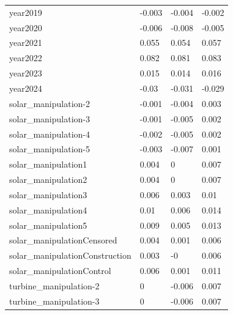 \documentclass{article}
\begin{document}
\begin{table}[]
\begin{tabular}{llll}
year2019                          & -0.003            & -0.004         & -0.002          \\
year2020                          & -0.006            & -0.008         & -0.005          \\
year2021                          & 0.055             & 0.054          & 0.057           \\
year2022                          & 0.082             & 0.081          & 0.083           \\
year2023                          & 0.015             & 0.014          & 0.016           \\
year2024                          & -0.03             & -0.031         & -0.029          \\
solar\_manipulation-2             & -0.001            & -0.004         & 0.003           \\
solar\_manipulation-3             & -0.001            & -0.005         & 0.002           \\
solar\_manipulation-4             & -0.002            & -0.005         & 0.002           \\
solar\_manipulation-5             & -0.003            & -0.007         & 0.001           \\
solar\_manipulation1              & 0.004             & 0              & 0.007           \\
solar\_manipulation2              & 0.004             & 0              & 0.007           \\
solar\_manipulation3              & 0.006             & 0.003          & 0.01            \\
solar\_manipulation4              & 0.01              & 0.006          & 0.014           \\
solar\_manipulation5              & 0.009             & 0.005          & 0.013           \\
solar\_manipulationCensored       & 0.004             & 0.001          & 0.006           \\
solar\_manipulationConstruction   & 0.003             & -0             & 0.006           \\
solar\_manipulationControl        & 0.006             & 0.001          & 0.011           \\
turbine\_manipulation-2           & 0                 & -0.006         & 0.007           \\
turbine\_manipulation-3           & 0                 & -0.006         & 0.007           \\

\end{tabular}
\end{table}
\end{document}

